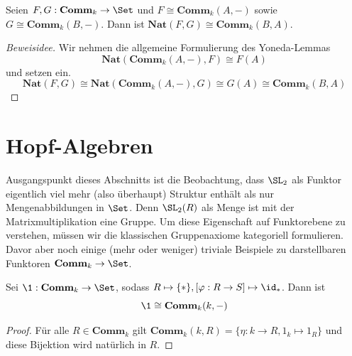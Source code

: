 \documentclass[11pt]{article}
\newcommand{\Comm}{\mathbf{Comm}}
\newcommand{\Nat}{\mathbf{Nat}}
\begin{document}
\begin{theorem} \Theorem Seien $F, G: \Comm_k \to \Set$ und $F\cong \Comm_k(A,-)$ sowie $G\cong \Comm_k(B,-)$.
    Dann ist $\Nat(F,G) \cong \Comm_k(B,A)$.
\end{theorem}
\begin{proof}[Beweisidee]
    Wir nehmen die allgemeine Formulierung des Yoneda-Lemmas
    $$\Nat(\Comm_k(A,-), F) \cong F(A)$$
    und setzen ein.
    $$\Nat(F,G) \cong \Nat(\Comm_k(A,-), G) \cong G(A) \cong \Comm_k(B,A)$$
\end{proof}

\newpage

\section{Hopf-Algebren}
Ausgangspunkt dieses Abschnitts ist die Beobachtung, dass $\SL_2$ als Funktor 
eigentlich viel mehr (also überhaupt) Struktur enthält als nur Mengenabbildungen in $\Set$. Denn $\SL_2(R)$ als Menge ist mit der 
Matrixmultiplikation eine Gruppe. Um diese Eigenschaft auf Funktorebene zu verstehen, müssen wir die klassischen Gruppenaxiome 
kategoriell formulieren. Davor aber noch einige (mehr oder weniger) triviale Beispiele zu darstellbaren Funktoren $\Comm_k \to \Set$.

\begin{lemma}[1-Funktor] \Theorem Sei $\1: \Comm_k \to \Set$, sodass $R\mapsto \{*\}, [\varphi: R\to S] \mapsto \id_*$. Dann ist 
    $$\1 \cong \Comm_k(k,-)$$
\begin{proof}
    Für alle $R\in \Comm_k$ gilt $\Comm_k(k,R) = \{\eta: k \to R, 1_k \mapsto 1_R\}$ und diese Bijektion
     wird natürlich in $R$. 
\end{proof}
\end{lemma}
\end{document}
